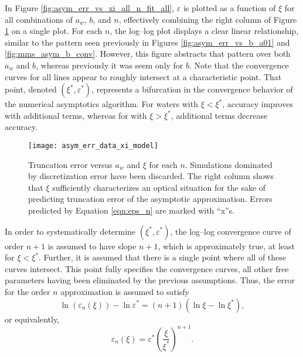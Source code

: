 In Figure \ref{fig:asym_err_vs_xi_all_n_fit_all}, $\varepsilon$ is plotted as a function of $\xi$ for all combinations of $a_w$, $b$, and $n$, effectively combining the right column of Figure \ref{fig:asym_err_data_xi_model} on a single plot.
For each $n$, the log--log plot displays a clear linear relationship, similar to the pattern seen previously in Figures \ref{fig:asym_err_vs_b_a01} and \ref{fig:mms_asym_b_conv}.
However, this figure abstracts that pattern over both $a_w$ and $b$, whereas previously it was seem only for $b$.
Note that the convergence curves for all lines appear to roughly intersect at a characteristic point.
That point, denoted $(\xi^*, \varepsilon^*)$, represents a bifurcation in the convergence behavior of the numerical asymptotics algorithm.
For waters with $\xi < \xi^*$, accuracy improves with additional terms, whereas for with $\xi > \xi^*$, additional terms decrease accuracy.

\begin{figure}[H]
  \centering
  \texttt{[image: asym\_err\_data\_xi\_model]}
  \caption{Truncation error versus $a_w$ and $\xi$ for each $n$. Simulations dominated by discretization error have been discarded. The right column shows that $\xi$ sufficiently characterizes an optical situation for the sake of predicting truncation error of the asymptotic approximation. Errors predicted by Equation \eqref{eqn:eps_n} are marked with ``x''s.}
  \label{fig:asym_err_data_xi_model}
\end{figure}


In order to systematically determine $(\xi^*, \varepsilon^*)$, the log--log convergence curve of order $n+1$ is assumed to have slope $n+1$, which is approximately true, at least for $\xi<\xi^*$.
Further, it is assumed that there is a single point where all of these curves intersect.
This point fully specifies the convergence curves, all other free parameters having been eliminated by the previous assumptions.
Thus, the error for the order $n$ approximation is assumed to satisfy
\begin{equation}
  \label{eqn:ln_eps_n}
  \ln\left(\varepsilon_n(\xi)\right) - \ln\varepsilon^* = (n+1)\left(\ln\xi - \ln\xi^*\right),
\end{equation}
or equivalently,
\begin{equation}
  \label{eqn:eps_n}
  \varepsilon_n(\xi) = \varepsilon^* \left(\frac{\xi}{\xi^*}\right)^{n+1}.
\end{equation}

